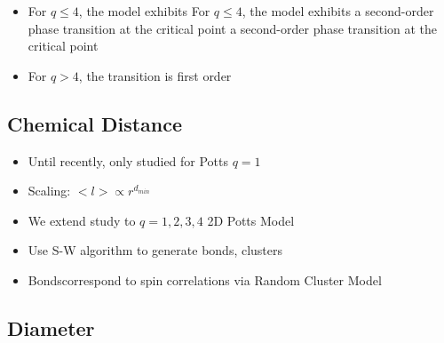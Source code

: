 \documentclass{umthesis}          %
\begin{document}
\begin{itemize}
\begin{itemize}
\end{itemize} %

\item For $q \le 4$, the model exhibits For $q \le 4$, the model exhibits a second-order phase transition at the critical point a second-order phase transition at the critical point\\
\label{sec-4.1.1.6}


\item For $q>4$, the transition is first order \cite{Bax}\\
\label{sec-4.1.1.7}

\end{itemize} %
\subsection{Chemical Distance}
\label{sec-4.1.2}

\begin{itemize}

\item Until recently, only studied for Potts $q=1$\\
\label{sec-4.1.2.1}


\item Scaling: $< l > \propto r^{d_{min}}$\\
\label{sec-4.1.2.2}


\item We extend study to $q=1,2,3,4$ 2D Potts Model\\
\label{sec-4.1.2.3}


\item Use S-W algorithm to generate bonds, clusters\\
\label{sec-4.1.2.4}


\item Bondscorrespond to spin correlations via Random Cluster Model\\
\label{sec-4.1.2.5}

\end{itemize} %
\subsection{Diameter}
\label{sec-4.1.3}
\end{document}
